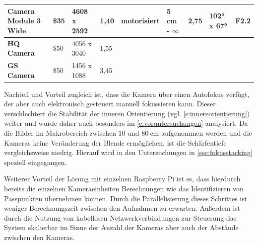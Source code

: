 \documentclass[./00PhotoBox.tex]{subfiles}
\begin{document}
\begin{table}
{\begin{tabular}{l|l|l|l|ll|l|l|l|}
            \multicolumn{1}{|l|}{\textbf{Camera Module 3 Wide}} & \$35                         & \cellcolor[HTML]{9AFF99}4608 x 2592                                  & 1,40                                                              & \multicolumn{1}{l|}{\cellcolor[HTML]{9AFF99}motorisiert}                    & \cellcolor[HTML]{9AFF99}5 cm - $\infty$                       & 2,75                     & 102° x 67°               & F2.2                         \\ \hline
            \multicolumn{1}{|l|}{\textbf{HQ Camera}}            & \cellcolor[HTML]{FFCCC9}\$50 & 4056 x 3040                                                          & 1,55                                                              & \multicolumn{1}{l|}{\cellcolor[HTML]{FFCCC9}{\color[HTML]{000000} manuell}} & \cellcolor[HTML]{C0C0C0}                                      & \cellcolor[HTML]{C0C0C0} & \cellcolor[HTML]{C0C0C0} & \cellcolor[HTML]{C0C0C0}     \\ \hline
            \multicolumn{1}{|l|}{\textbf{GS Camera}}            & \cellcolor[HTML]{FFCCC9}\$50 & 1456 x 1088                                                          & \cellcolor[HTML]{9AFF99}3,45                                      & \multicolumn{1}{l|}{\cellcolor[HTML]{FFCCC9}{\color[HTML]{000000} manuell}} & \cellcolor[HTML]{C0C0C0}                                      & \cellcolor[HTML]{C0C0C0} & \cellcolor[HTML]{C0C0C0} & \cellcolor[HTML]{C0C0C0}     \\ \hline
        \end{tabular}
    }
\end{table}

Nachteil und Vorteil zugleich ist, dass die Kamera über einen Autofokus verfügt, der aber auch elektronisch gesteuert manuell fokussieren kann. Dieser verschlechtert die Stabilität der inneren Orientierung (vgl. \autoref{s:innereorientierung}) weiter und wurde daher auch besonders im \autoref{c:voruntersuchungen} analysiert. Da die Bilder im Makrobereich zwischen $10$ und $80~\text{cm}$ aufgenommen werden und die Kameras keine Veränderung der Blende ermöglichen, ist die Schärfentiefe vergleichsweise niedrig. Hierauf wird in den Untersuchungen in \autoref{sec:fokusstacking} speziell eingegangen.

Weiterer Vorteil der Lösung mit einzelnen Raspberry Pi ist es, dass hierdurch bereits die einzelnen Kameraeinheiten Berechnungen wie das Identifizieren von Passpunkten übernehmen können. Durch die Parallelisierung dieses Schrittes ist weniger Berechnungszeit zwischen den Aufnahmen zu erwarten. Außerdem ist durch die Nutzung von kabellosen Netzwerkverbindungen zur Steuerung das System skalierbar im Sinne der Anzahl der Kameras aber auch der Abstände zwischen den Kameras.
\end{document}
